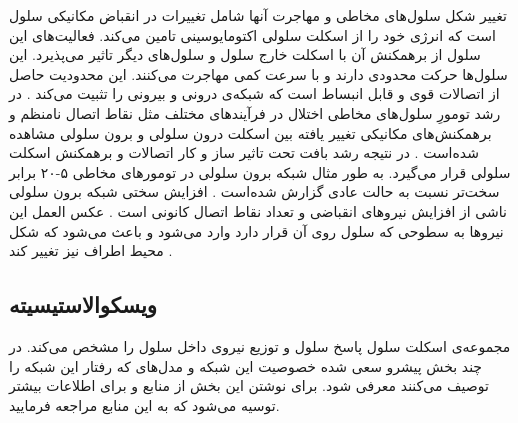 تغییر شکل سلول‌های مخاطی و مهاجرت آنها شامل تغییرات در انقباض مکانیکی سلول است که انرژی خود را از اسکلت سلولی اکتومایوسینی تامین می‌کند. فعالیت‌های این سلول از برهمکنش‌ آن با اسکلت خارج سلول و  سلول‌های دیگر تاثیر می‌پذیرد. این سلول‌ها حرکت محدودی دارند و با سرعت کمی مهاجرت می‌کنند. این محدودیت حاصل از اتصالات قوی و قابل انبساط است که شبکه‌ی درونی و بیرونی را تثبیت می‌کند \cite{LANGE20132418}. در رشد تومورِ سلول‌های مخاطی اختلال در فرآیندهای مختلف مثل نقاط اتصال نامنظم و برهمکنش‌های مکانیکی تغییر یافته بین اسکلت درون سلولی و برون سلولی مشاهده شده‌است \cite{LANGE20132418}. در نتیجه رشد بافت تحت تاثیر ساز و کار اتصالات و برهمکنش اسکلت سلولی قرار می‌گیرد. به طور مثال شبکه برون سلولی در تومورهای مخاطی ۵-۲۰ برابر سخت‌تر نسبت به حالت عادی گزارش شده‌است \cite{Paszek:2005qq}. افزایش سختی شبکه برون سلولی ناشی از افزایش نیروهای انقباضی و تعداد نقاط اتصال کانونی است \cite{LANGE20132418}. عکس العمل این نیرو‌ها به سطوحی که سلول روی آن قرار دارد وارد می‌شود و باعث می‌شود که شکل محیط اطراف نیز تغییر کند \cite{PhysRevB.14.3438}.



\subsection{ویسکوالاستیسیته}
مجموعه‌ی اسکلت سلول پاسخ سلول و توزیع نیروی داخل سلول را مشخص می‌کند. در چند بخش  پیشرو سعی شده خصوصیت این شبکه و مدل‌های که رفتار این شبکه ‌را توصیف می‌کنند معرفی شود. برای نوشتن این بخش از منابع \cite{doi, Viscoelasticity, visco} و برای اطلاعات بیشتر توسیه می‌شود که به این منابع مراجعه فرمایید.
